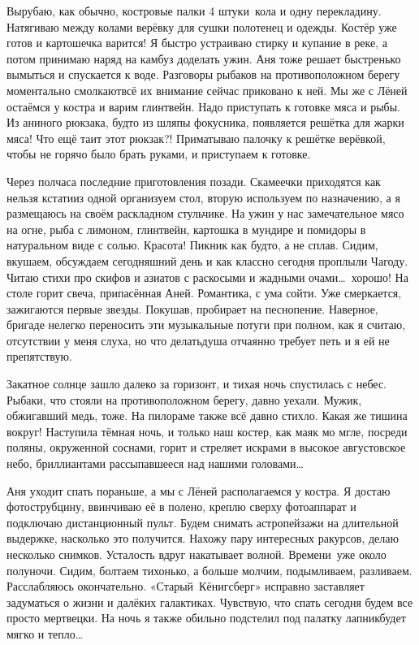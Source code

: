 Вырубаю, как обычно, костровые палки 4 штуки~кола и одну перекладину. Натягиваю между колами верёвку для сушки полотенец и одежды. Костёр уже готов и картошечка варится! Я быстро устраиваю стирку и купание в реке, а потом принимаю наряд на камбуз доделать ужин. Аня тоже решает быстренько вымыться и спускается к воде. Разговоры рыбаков на противоположном берегу моментально смолкают\mdash всё их внимание сейчас приковано к ней. Мы же с Лёней остаёмся у костра и варим глинтвейн. Надо приступать к готовке мяса и рыбы. Из аниного рюкзака, будто из шляпы фокусника, появляется решётка для жарки мяса! Что ещё таит этот рюкзак?! Приматываю палочку к решётке верёвкой, чтобы не горячо было брать руками, и приступаем к готовке. 

Через полчаса последние приготовления позади. Скамеечки приходятся как нельзя кстати\mdash из одной организуем стол, вторую используем по назначению, а я размещаюсь на своём раскладном стульчике. На ужин у нас замечательное мясо на огне, рыба с лимоном, глинтвейн, картошка в мундире и помидоры в натуральном виде с солью. Красота! Пикник как будто, а не сплав. Сидим, вкушаем, обсуждаем сегодняшний день и как классно сегодня проплыли Чагоду. Читаю стихи про скифов и азиатов с раскосыми и жадными очами\ldots~хорошо! На столе горит свеча, припасённая Аней. Романтика, с ума сойти. Уже смеркается, зажигаются первые звезды. Покушав, пробирает на песнопение. Наверное, бригаде нелегко переносить эти музыкальные потуги при полном, как я считаю, отсутствии у меня слуха, но что делать\mdash душа отчаянно требует петь и я ей не препятствую. 

Закатное солнце зашло далеко за горизонт, и тихая ночь спустилась с небес. Рыбаки, что стояли на противоположном берегу, давно уехали. Мужик, обжигавший медь, тоже. На пилораме также всё давно стихло. Какая же тишина вокруг! Наступила тёмная ночь, и только наш костер, как маяк мо мгле, посреди поляны, окруженной соснами, горит и стреляет искрами в высокое августовское небо, бриллиантами рассыпавшееся над нашими головами\ldots~

Аня уходит спать пораньше, а мы с Лёней располагаемся у костра. Я достаю фотострубцину, ввинчиваю её в полено, креплю сверху фотоаппарат и подключаю дистанционный пульт. Будем снимать астропейзажи на длительной выдержке, насколько это получится. Нахожу пару интересных ракурсов, делаю несколько снимков. Усталость вдруг накатывает волной. Времени~уже около полуночи. Сидим, болтаем тихонько, а больше молчим, подымливаем, разливаем. Расслабляюсь окончательно. «Старый~Кёнигсберг» исправно заставляет задуматься о жизни и далёких галактиках. Чувствую, что спать сегодня будем все просто мертвецки. На ночь я также обильно подстелил под палатку лапник\mdash будет мягко и тепло\ldots~
  
